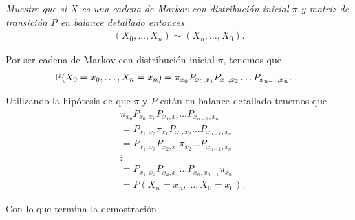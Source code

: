 \emph{
    Muestre que si $X$ es una cadena de Markov con distribución inicial $\pi$ y matriz de transición $P$ en balance detallado entonces
    \begin{align}
            (X_0, \dots, X_n) \sim (X_n, \dots, X_0).
    \end{align}
}

\afterstatement\pn

Por ser cadena de Markov con distribución inicial $\pi$, tenemos que
\begin{align}
        \P(X_0 = x_0, \dots, X_n = x_n) &=  \pi_{x_0} P_{x_0, x_1} P_{x_1, x_2} \dots P_{x_{n-1}, x_{n}}.
\end{align}\pn

Utilizando la hipótesis de que $\pi$ y $P$ están en balance detallado tenemos que
\begin{align}
    &   \pi_{x_0} P_{x_0, x_1} P_{x_1, x_2} \dots P_{x_{n-1}, x_{n}}    \\
    &=  P_{x_1, x_0} \pi_{x_1} P_{x_1, x_2} \dots P_{x_{n-1}, x_{n}}    \\
    &=  P_{x_1, x_0} P_{x_2, x_1} \pi_{x_2} \dots P_{x_{n-1}, x_{n}}    \\
    &\vdots                                                             \\
    &=  P_{x_1, x_0} P_{x_2, x_1} \dots P_{x_{n}, x_{n-1}} \pi_{x_n}    \\
    &= P(X_n = x_n, \dots, X_0 = x_0).
\end{align}\pn

Con lo que termina la demostración.